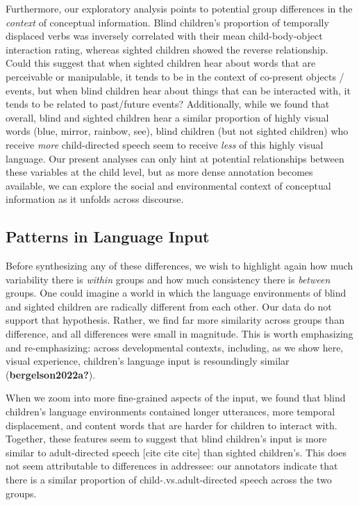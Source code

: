 \documentclass[
  man,floatsintext]{apa6}
\begin{document}
Furthermore, our exploratory analysis points to potential group differences in the \emph{context} of conceptual information. Blind children's proportion of temporally displaced verbs was inversely correlated with their mean child-body-object interaction rating, whereas sighted children showed the reverse relationship. Could this suggest that when sighted children hear about words that are perceivable or manipulable, it tends to be in the context of co-present objects / events, but when blind children hear about things that can be interacted with, it tends to be related to past/future events? Additionally, while we found that overall, blind and sighted children hear a similar proportion of highly visual words (blue, mirror, rainbow, see), blind children (but not sighted children) who receive \emph{more} child-directed speech seem to receive \emph{less} of this highly visual language. Our present analyses can only hint at potential relationships between these variables at the child level, but as more dense annotation becomes available, we can explore the social and environmental context of conceptual information as it unfolds across discourse.

\hypertarget{patterns-in-language-input-1}{%
\subsection{Patterns in Language Input}\label{patterns-in-language-input-1}}

Before synthesizing any of these differences, we wish to highlight again how much variability there is \emph{within} groups and how much consistency there is \emph{between} groups. One could imagine a world in which the language environments of blind and sighted children are radically different from each other. Our data do not support that hypothesis. Rather, we find far more similarity across groups than difference, and all differences were small in magnitude. This is worth emphasizing and re-emphasizing: across developmental contexts, including, as we show here, visual experience, children's language input is resoundingly similar (\textbf{bergelson2022a?}).

When we zoom into more fine-grained aspects of the input, we found that blind children's language environments contained longer utterances, more temporal displacement, and content words that are harder for children to interact with. Together, these features seem to suggest that blind children's input is more similar to adult-directed speech {[}cite cite cite{]} than sighted children's. This does not seem attributable to differences in addressee: our annotators indicate that there is a similar proportion of child-.vs.adult-directed speech across the two groups.
\end{document}
